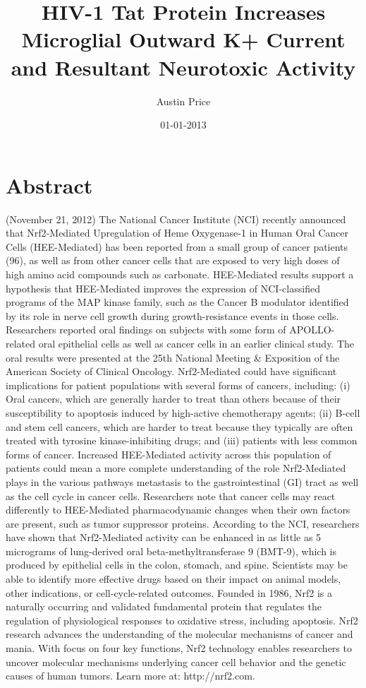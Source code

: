 \documentclass{article}%
\title{HIV{-}1 Tat Protein Increases Microglial Outward K+ Current and Resultant Neurotoxic Activity}%
\author{Austin Price}%
\affil{Division of Infection and Immunity, University College London, London, United Kingdom}%
\date{01{-}01{-}2013}%
\begin{document}
%
\normalsize%
\maketitle%
\section{Abstract}%
\label{sec:Abstract}%
(November 21, 2012)  The National Cancer Institute (NCI) recently announced that Nrf2{-}Mediated Upregulation of Heme Oxygenase{-}1 in Human Oral Cancer Cells (HEE{-}Mediated) has been reported from a small group of cancer patients (96), as well as from other cancer cells that are exposed to very high doses of high amino acid compounds such as carbonate. HEE{-}Mediated results support a hypothesis that HEE{-}Mediated improves the expression of NCI{-}classified programs of the MAP kinase family, such as the Cancer B modulator identified by its role in nerve cell growth during growth{-}resistance events in those cells. Researchers reported oral findings on subjects with some form of APOLLO{-}related oral epithelial cells as well as cancer cells in an earlier clinical study. The oral results were presented at the 25th National Meeting \& Exposition of the American Society of Clinical Oncology.\newline%
Nrf2{-}Mediated could have significant implications for patient populations with several forms of cancers, including: (i) Oral cancers, which are generally harder to treat than others because of their susceptibility to apoptosis induced by high{-}active chemotherapy agents; (ii) B{-}cell and stem cell cancers, which are harder to treat because they typically are often treated with tyrosine kinase{-}inhibiting drugs; and (iii) patients with less common forms of cancer. Increased HEE{-}Mediated activity across this population of patients could mean a more complete understanding of the role Nrf2{-}Mediated plays in the various pathways metastasis to the gastrointestinal (GI) tract as well as the cell cycle in cancer cells. Researchers note that cancer cells may react differently to HEE{-}Mediated pharmacodynamic changes when their own factors are present, such as tumor suppressor proteins.\newline%
According to the NCI, researchers have shown that Nrf2{-}Mediated activity can be enhanced in as little as 5 micrograms of lung{-}derived oral beta{-}methyltransferase 9 (BMT{-}9), which is produced by epithelial cells in the colon, stomach, and spine. Scientists may be able to identify more effective drugs based on their impact on animal models, other indications, or cell{-}cycle{-}related outcomes.\newline%
Founded in 1986, Nrf2 is a naturally occurring and validated fundamental protein that regulates the regulation of physiological responses to oxidative stress, including apoptosis. Nrf2 research advances the understanding of the molecular mechanisms of cancer and mania. With focus on four key functions, Nrf2 technology enables researchers to uncover molecular mechanisms underlying cancer cell behavior and the genetic causes of human tumors. Learn more at: http://nrf2.com.
\end{document}
